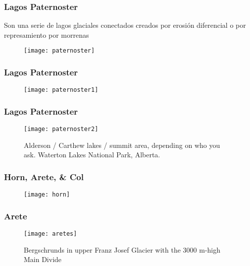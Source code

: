 \documentclass{beamer}
\begin{document}
\begin{frame}
\frametitle{Lagos Paternoster}
\small{Son una serie de lagos glaciales conectados creados por erosión diferencial o por represamiento por morrenas}
\begin{figure}
\begin{center}
\texttt{[image: paternoster]}
\end{center}
\end{figure}
\end{frame}
\begin{frame}
\frametitle{Lagos Paternoster}
\begin{figure}
\begin{center}
\texttt{[image: paternoster1]}
\end{center}
\end{figure}
\end{frame}
\begin{frame}
\frametitle{Lagos Paternoster}
\begin{figure}
\begin{center}
\texttt{[image: paternoster2]}
\end{center}
\caption{Alderson / Carthew lakes / summit area, depending on who you ask. Waterton Lakes National Park, Alberta.}
\end{figure}
\end{frame}
\begin{frame}
\frametitle{Horn, Arete, \& Col}
\begin{figure}
\begin{center}
\texttt{[image: horn]}
\end{center}
\end{figure}
\end{frame}
\begin{frame}
\frametitle{Arete}
\begin{figure}
\begin{center}
\texttt{[image: aretes]}
\end{center}
\caption{Bergschrunds in upper Franz Josef Glacier with the 3000 m-high Main Divide}
\end{figure}
\end{frame}
\end{document}
